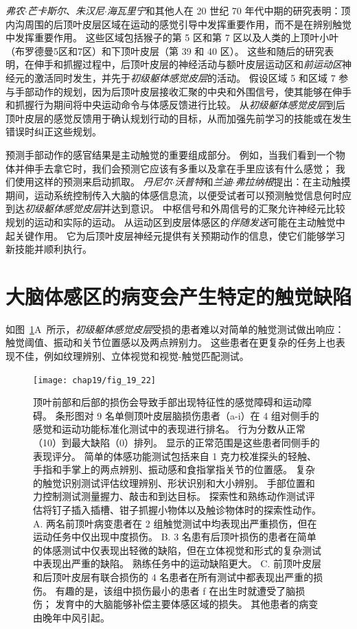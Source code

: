 \textit{弗农$\cdot$芒卡斯尔}、\textit{朱汉尼$\cdot$海瓦里宁}和其他人在 20 世纪 70 年代中期的研究表明：顶内沟周围的后顶叶皮层区域在运动的感觉引导中发挥重要作用，而不是在辨别触觉中发挥重要作用。
这些区域包括猴子的第 5 区和第 7 区以及人类的上顶叶小叶（布罗德曼5区和7区）和下顶叶皮层（第 39 和 40 区）。
这些和随后的研究表明，在伸手和抓握过程中，后顶叶皮层的神经活动与额叶皮层运动区和\textit{前运动区}神经元的激活同时发生，并先于\textit{初级躯体感觉皮层}的活动。
假设区域 5 和区域 7 参与手部动作的规划，因为后顶叶皮层接收汇聚的中央和外围信号，使其能够在伸手和抓握行为期间将中央运动命令与体感反馈进行比较。
从\textit{初级躯体感觉皮层}到后顶叶皮层的感觉反馈用于确认规划行动的目标，从而加强先前学习的技能或在发生错误时纠正这些规划。


预测手部动作的感官结果是主动触觉的重要组成部分。
例如，当我们看到一个物体并伸手去拿它时，我们会预测它应该有多重以及拿在手里应该有什么感觉；
我们使用这样的预测来启动抓取。
\textit{丹尼尔$\cdot$沃普特}和\textit{兰迪$\cdot$弗拉纳根}提出：在主动触摸期间，运动系统控制传入大脑的体感信息流，以便受试者可以预测触觉信息何时应到达\textit{初级躯体感觉皮层}并达到意识。
中枢信号和外周信号的汇聚允许神经元比较规划的运动和实际的运动。
从运动区到皮层体感区的\textit{伴随发送}可能在主动触觉中起关键作用。
它为后顶叶皮层神经元提供有关预期动作的信息，使它们能够学习新技能并顺利执行。



\section{大脑体感区的病变会产生特定的触觉缺陷}

如图~\ref{fig:19_22}A~所示，\textit{初级躯体感觉皮层}受损的患者难以对简单的触觉测试做出响应：触觉阈值、振动和关节位置感以及两点辨别力。
这些患者在更复杂的任务上也表现不佳，例如纹理辨别、立体视觉和视觉-触觉匹配测试。


\begin{figure}[htbp]
	\centering
	\texttt{[image: chap19/fig\_19\_22]}
	\caption{顶叶前部和后部的损伤会导致手部出现特征性的感觉障碍和运动障碍。
		条形图对 9 名单侧顶叶皮层脑损伤患者（a-i）在 4 组对侧手的感觉和运动功能标准化测试中的表现进行排名。
		行为分数从正常（10）到最大缺陷（0）排列。
		显示的正常范围是这些患者同侧手的表现评分。
		简单的体感功能测试包括来自 1 克力校准探头的轻触、手指和手掌上的两点辨别、振动感和食指掌指关节的位置感。
		复杂的触觉识别测试评估纹理辨别、形状识别和大小辨别。
		手部位置和力控制测试测量握力、敲击和到达目标。
		探索性和熟练动作测试评估将钉子插入插槽、钳子抓握小物体以及触诊物体时的探索性动作\cite{pause1989sensorimotor}。
		A. 两名前顶叶病变患者在 2 组触觉测试中均表现出严重损伤，但在运动任务中仅出现中度损伤。
		B. 3 名患有后顶叶损伤的患者在简单的体感测试中仅表现出轻微的缺陷，但在立体视觉和形式的复杂测试中表现出严重的缺陷。
		熟练任务中的运动缺陷更大。
		C. 前顶叶皮层和后顶叶皮层有联合损伤的 4 名患者在所有测试中都表现出严重的损伤。
		有趣的是，该组中损伤最小的患者 f 在出生时就遭受了脑损伤；
		发育中的大脑能够补偿主要体感区域的损失。
		其他患者的病变由晚年中风引起。}
	\label{fig:19_22}
\end{figure}


